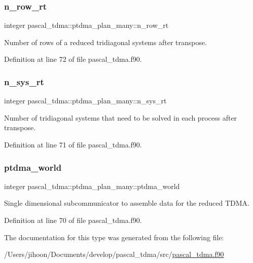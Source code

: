 \subsubsection{\texorpdfstring{n\_row\_rt}{n\_row\_rt}}
{\footnotesize\ttfamily integer pascal\+\_\+tdma\+::ptdma\+\_\+plan\+\_\+many\+::n\+\_\+row\+\_\+rt}



Number of rows of a reduced tridiagonal systems after transpose. 



Definition at line 72 of file pascal\+\_\+tdma.\+f90.

\mbox{\label{structpascal__tdma_1_1ptdma__plan__many_a22b42947ab742f83aad3bbeb3a42a0f6}} 
\subsubsection{\texorpdfstring{n\_sys\_rt}{n\_sys\_rt}}
{\footnotesize\ttfamily integer pascal\+\_\+tdma\+::ptdma\+\_\+plan\+\_\+many\+::n\+\_\+sys\+\_\+rt}



Number of tridiagonal systems that need to be solved in each process after transpose. 



Definition at line 71 of file pascal\+\_\+tdma.\+f90.

\mbox{\label{structpascal__tdma_1_1ptdma__plan__many_acb7e645e37c791564905c6e2808db0c6}} 
\subsubsection{\texorpdfstring{ptdma\_world}{ptdma\_world}}
{\footnotesize\ttfamily integer pascal\+\_\+tdma\+::ptdma\+\_\+plan\+\_\+many\+::ptdma\+\_\+world}



Single dimensional subcommunicator to assemble data for the reduced T\+D\+MA. 



Definition at line 70 of file pascal\+\_\+tdma.\+f90.



The documentation for this type was generated from the following file\+:\begin{DoxyCompactItemize}
\item 
/\+Users/jihoon/\+Documents/develop/pascal\+\_\+tdma/src/\mbox{\hyperlink{pascal__tdma_8f90}{pascal\+\_\+tdma.\+f90}}\end{DoxyCompactItemize}
